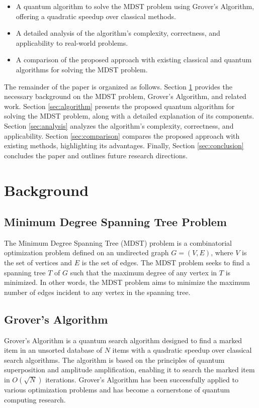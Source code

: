 \begin{itemize}
    \item A quantum algorithm to solve the MDST problem using Grover's Algorithm, offering a quadratic speedup over classical methods.
    \item A detailed analysis of the algorithm's complexity, correctness, and applicability to real-world problems.
    \item A comparison of the proposed approach with existing classical and quantum algorithms for solving the MDST problem.
\end{itemize}

The remainder of the paper is organized as follows. Section \ref{sec:background} provides the necessary background on the MDST problem, Grover's Algorithm, and related work. Section \ref{sec:algorithm} presents the proposed quantum algorithm for solving the MDST problem, along with a detailed explanation of its components. Section \ref{sec:analysis} analyzes the algorithm's complexity, correctness, and applicability. Section \ref{sec:comparison} compares the proposed approach with existing methods, highlighting its advantages. Finally, Section \ref{sec:conclusion} concludes the paper and outlines future research directions.

\section{Background}
\label{sec:background}

\subsection{Minimum Degree Spanning Tree Problem}
The Minimum Degree Spanning Tree (MDST) problem is a combinatorial optimization problem defined on an undirected graph $G = (V, E)$, where $V$ is the set of vertices and $E$ is the set of edges. The MDST problem seeks to find a spanning tree $T$ of $G$ such that the maximum degree of any vertex in $T$ is minimized. In other words, the MDST problem aims to minimize the maximum number of edges incident to any vertex in the spanning tree.

\subsection{Grover's Algorithm}
Grover's Algorithm \cite{grover} is a quantum search algorithm designed to find a marked item in an unsorted database of $N$ items with a quadratic speedup over classical search algorithms. The algorithm is based on the principles of quantum superposition and amplitude amplification, enabling it to search the marked item in $O(\sqrt{N})$ iterations. Grover's Algorithm has been successfully applied to various optimization problems and has become a cornerstone of quantum computing research.

